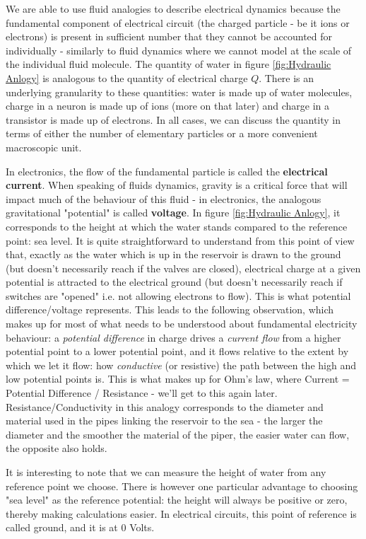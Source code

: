 We are able to use fluid analogies to describe electrical dynamics because the fundamental component of electrical circuit (the charged particle - be it ions or electrons) is present in sufficient number that they cannot be accounted for individually - similarly to fluid dynamics where we cannot model at the scale of the individual fluid molecule. The quantity of water in figure \ref{fig:Hydraulic Anlogy} is analogous to the quantity of electrical charge $Q$. There is an underlying granularity to these quantities: water is made up of water molecules, charge in a neuron is made up of ions (more on that later) and charge in a transistor is made up of electrons. In all cases, we can discuss the quantity in terms of either the number of elementary particles or a more convenient macroscopic unit.  

In electronics, the flow of the fundamental particle is called the \textbf{electrical current}. When speaking of fluids dynamics, gravity is a critical force that will impact much of the behaviour of this fluid - in electronics, the analogous gravitational "potential" is called \textbf{voltage}. In figure \ref{fig:Hydraulic Anlogy}, it corresponds to the height at which the water stands compared to the reference point: sea level. It is quite straightforward to understand from this point of view that, exactly as the water which is up in the reservoir is drawn to the ground (but doesn't necessarily reach if the valves are closed), electrical charge at a given potential is attracted to the electrical ground (but doesn't necessarily reach if switches are "opened" i.e. not allowing electrons to flow). This is what potential difference/voltage represents. This leads to the following observation, which makes up for most of what needs to be understood about fundamental electricity behaviour: a \textit{potential difference} in charge drives a \textit{current flow} from a higher potential point to a lower potential point, and it flows relative to the extent by which we let it flow: how \textit{conductive} (or resistive) the path between the high and low potential points is. This is what makes up for Ohm's law, where Current = Potential Difference / Resistance - we'll get to this again later. Resistance/Conductivity in this analogy corresponds to the diameter and material used in the pipes linking the reservoir to the sea - the larger the diameter and the smoother the material of the piper, the easier water can flow, the opposite also holds. 

It is interesting to note that we can measure the height of water from any reference point we choose. There is however one particular advantage to choosing "sea level" as the reference potential: the height will always be positive or zero, thereby making calculations easier. In electrical circuits, this point of reference is called ground, and it is at 0 Volts. 

